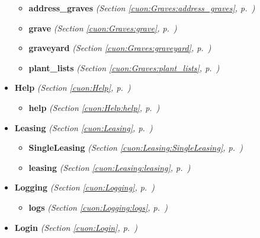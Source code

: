 \begin{itemize}
\begin{itemize}
    \item \textbf{address\_graves}
  \textit{(Section \ref{cuon:Graves:address_graves}, p.~\pageref{cuon:Graves:address_graves})}

    \item \textbf{grave}
  \textit{(Section \ref{cuon:Graves:grave}, p.~\pageref{cuon:Graves:grave})}

    \item \textbf{graveyard}
  \textit{(Section \ref{cuon:Graves:graveyard}, p.~\pageref{cuon:Graves:graveyard})}

    \item \textbf{plant\_lists}
  \textit{(Section \ref{cuon:Graves:plant_lists}, p.~\pageref{cuon:Graves:plant_lists})}

  \end{itemize}
\item \textbf{Help}
  \textit{(Section \ref{cuon:Help}, p.~\pageref{cuon:Help})}

  \begin{itemize}
\setlength{\parskip}{0ex}
    \item \textbf{help}
  \textit{(Section \ref{cuon:Help:help}, p.~\pageref{cuon:Help:help})}

  \end{itemize}
\item \textbf{Leasing}
  \textit{(Section \ref{cuon:Leasing}, p.~\pageref{cuon:Leasing})}

  \begin{itemize}
\setlength{\parskip}{0ex}
    \item \textbf{SingleLeasing}
  \textit{(Section \ref{cuon:Leasing:SingleLeasing}, p.~\pageref{cuon:Leasing:SingleLeasing})}

    \item \textbf{leasing}
  \textit{(Section \ref{cuon:Leasing:leasing}, p.~\pageref{cuon:Leasing:leasing})}

  \end{itemize}
\item \textbf{Logging}
  \textit{(Section \ref{cuon:Logging}, p.~\pageref{cuon:Logging})}

  \begin{itemize}
\setlength{\parskip}{0ex}
    \item \textbf{logs}
  \textit{(Section \ref{cuon:Logging:logs}, p.~\pageref{cuon:Logging:logs})}

  \end{itemize}
\item \textbf{Login}
  \textit{(Section \ref{cuon:Login}, p.~\pageref{cuon:Login})}


\end{itemize}
